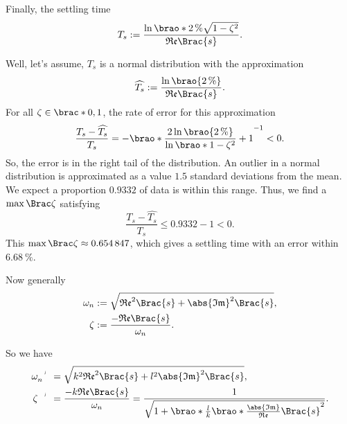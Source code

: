 \documentclass[11pt]{article}
\begin{document}
\begin{adjustwidth}{0.5in}{0in}
        Finally, the settling time
        \[
            T_s
            := \frac{\ln\brao*{\SI2\percent \sqrt{1 - \zeta^2}}}{\mathfrak{Re}\Brac{s}}.
        \]

        Well, let's assume, \(T_s\) is a normal distribution with the approximation
        \[
            \widehat{T_s}
            := \frac{\ln\brao{\SI2\percent}}{\mathfrak{Re}\Brac{s}}.
        \]
        For all \(\zeta \in \brac*{0,1}\), the rate of error for this approximation
        \[
             \frac{T_s - \widehat{T_s}}{T_s}
             = -\brao*{\frac{2\ln\brao{\SI2\percent}}{\ln\brao*{1 - \zeta^2}} + 1}^{-1}
             < 0.
        \]
        So, the error is in the right tail of the distribution. An outlier in a normal distribution is approximated as a value \(1.5\) standard deviations from the mean. We expect a proportion \(0.9332\) of data is within this range. Thus, we find a \(\max\Brac\zeta\) satisfying
        \[
            \frac{T_s - \widehat{T_s}}{T_s}
            \leq \num{0.9332} - 1
            < 0.
        \]
        This \(\max\Brac\zeta \approx \num{0.654847}\), which gives a settling time with an error within \(\SI{6.68}\percent\).

        Now generally
        \[
            \begin{aligned}
                \omega_n
                    &{}:= \sqrt{\mathfrak{Re}^2\Brac{s} + \abs{\mathfrak{Im}}^2\Brac{s}},
            \\*
                \zeta
                    &{}:= \frac{-\mathfrak{Re}\Brac{s}}{\omega_n}.
            \\*
            \end{aligned}
        \]

        So we have
        \[
            \begin{aligned}
                \setprime{\omega}_n
                    &{}= \sqrt{k^2 \mathfrak{Re}^2\Brac{s} + l^2 \abs{\mathfrak{Im}}^2\Brac{s}},
            \\*
                \setprime\zeta
                    &{}= \frac{-k\mathfrak{Re}\Brac{s}}{\omega_n}
                    = \frac{1}{\sqrt{1 + \brao*{
                        \frac{l}k
                        \brao*{\frac
                            {\abs{\mathfrak{Im}}}
                            {\mathfrak{Re}}
                        }
                        \Brac{s}
                    }^2}}.
            \\*
            \end{aligned}
        \]


\end{adjustwidth}
\end{document}
